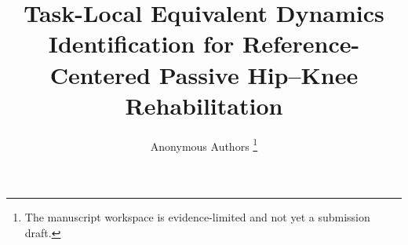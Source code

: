 \documentclass[journal]{IEEEtran}
\title{Task-Local Equivalent Dynamics Identification for Reference-Centered
Passive Hip--Knee Rehabilitation}
\author{Anonymous Authors%
\thanks{The manuscript workspace is evidence-limited and not yet a submission draft.}%
}
\begin{document}
\maketitle

\begin{abstract}
\end{abstract}

\begin{IEEEkeywords}
\end{IEEEkeywords}










% 
% 
\end{document}
